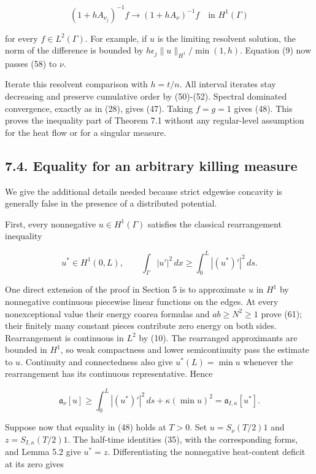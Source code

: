 \documentclass[11pt]{article}
\begin{document}
\[
(1+hA_{\nu_j})^{-1}f\longrightarrow(1+hA_\nu)^{-1}f
\quad\text{in }H^1(\Gamma)
\tag{60}
\]

for every \(f\in L^2(\Gamma)\). For example, if \(u\) is the limiting
resolvent solution, the norm of the difference is bounded by
\(h\epsilon_j\|u\|_{H^1}/\min(1,h)\). Equation (9) now passes (58) to
\(\nu\).

Iterate this resolvent comparison with \(h=t/n\). All interval iterates
stay decreasing and preserve cumulative order by (50)-(52). Spectral
dominated convergence, exactly as in (28), gives (47). Taking \(f=g=1\)
gives (48). This proves the inequality part of Theorem 7.1 without any
regular-level assumption for the heat flow or for a singular measure.

\subsection{7.4. Equality for an arbitrary killing
measure}\label{equality-for-an-arbitrary-killing-measure}

We give the additional details needed because strict edgewise concavity
is generally false in the presence of a distributed potential.

First, every nonnegative \(u\in H^1(\Gamma)\) satisfies the classical
rearrangement inequality

\[
u^*\in H^1(0,L),\qquad
\int_\Gamma|u'|^2\,dx\ge\int_0^L|(u^*)'|^2\,ds.
\tag{61}
\]

One direct extension of the proof in Section 5 is to approximate \(u\)
in \(H^1\) by nonnegative continuous piecewise linear functions on the
edges. At every nonexceptional value their energy coarea formulas and
\(ab\ge N^2\ge1\) prove (61); their finitely many constant pieces
contribute zero energy on both sides. Rearrangement is continuous in
\(L^2\) by (10). The rearranged approximants are bounded in \(H^1\), so
weak compactness and lower semicontinuity pass the estimate to \(u\).
Continuity and connectedness also give \(u^*(L)=\min u\) whenever the
rearrangement has its continuous representative. Hence

\[
\mathfrak a_\nu[u]\ge
\int_0^L|(u^*)'|^2\,ds+\kappa(\min u)^2
=\mathfrak a_{I,\kappa}[u^*].
\tag{62}
\]

Suppose now that equality in (48) holds at \(T>0\). Set
\(u=S_\nu(T/2)1\) and \(z=S_{I,\kappa}(T/2)1\). The half-time identities
(35), with the corresponding forms, and Lemma 5.2 give \(u^*=z\).
Differentiating the nonnegative heat-content deficit at its zero gives
\end{document}
